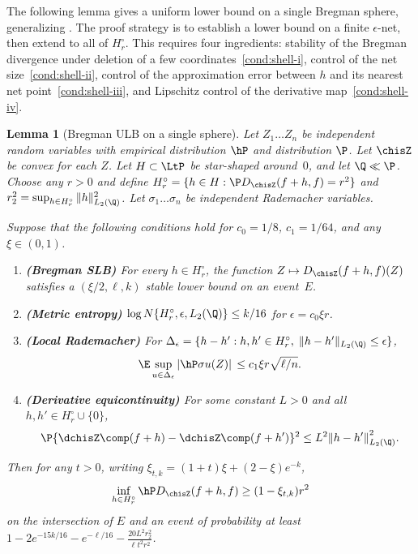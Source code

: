 \documentclass{article}
\newtheorem{lemma}[theorem]{Lemma}
\begin{document}
The following lemma gives a uniform lower bound on a single Bregman sphere, generalizing \citet[Theorem 3.1]{mendelson2021extending}.
The proof strategy is to establish a lower bound
on a finite $\epsilon$-net, then extend to all of $H_r^\circ$.
This requires four ingredients:
stability of the Bregman divergence
under deletion of a few coordinates~\ref{cond:shell-i},
control of the net size~\ref{cond:shell-ii},
control of the approximation error
between $h$ and its nearest net point~\ref{cond:shell-iii},
and Lipschitz control
of the derivative map~\ref{cond:shell-iv}.
\begin{lemma}[Bregman ULB on a single sphere]
\label{lem:bregman-shell}
Let $Z_1 \ldots Z_n$ be independent random variables
with empirical distribution $\hP$ and distribution $\P$.
Let $\chisZ$ be convex for each $Z$.
Let $H \subset \LtP$ be star-shaped around~$0$,
and let $\Q \ll \P$.
Choose any $r > 0$ and define
$H_r^\circ = \{h \in H : \P D_{\chisZ}(f+h, f) = r^2\}$
and $r_2^2 = \sup_{h \in H_r^\circ} \|h\|_{L_2(\Q)}^2$.
Let $\sigma_1 \ldots \sigma_n$ be independent Rademacher variables.

\smallskip

Suppose that the following conditions hold
for $c_0 = 1/8$, $c_1 = 1/64$, and any $\xi \in (0,1)$.
\begin{enumerate}[label=\textup{(\roman*)}]
\item\label{cond:shell-i} \textbf{(Bregman SLB)}
  For every $h \in H_r^\circ$,
  the function $Z \mapsto D_{\chisZ}(f+h, f)(Z)$
  satisfies a $(\xi/2, \ell, k)$ stable lower bound
  on an event~$E$.
\item\label{cond:shell-ii} \textbf{(Metric entropy)}
  $\log N\{H_r^\circ, \epsilon, L_2(\Q)\} \le k/16$
  for $\epsilon = c_0 \xi r$.
\item\label{cond:shell-iii} \textbf{(Local Rademacher)}
  For $\Delta_\epsilon = \{h - h' : h, h' \in H_r^\circ,\;
    \|h - h'\|_{L_2(\Q)} \le \epsilon\}$,
  \[
  \E \sup_{u \in \Delta_\epsilon}
    \abs*{\hP \sigma u(Z)}
    \le c_1 \xi r \sqrt{\ell/n}.
  \]
\item\label{cond:shell-iv} \textbf{(Derivative equicontinuity)}
  For some constant $L > 0$
  and all $h, h' \in H_r^\circ \cup \{0\}$,
  \[
  \P \{ \dchisZ \comp (f+h)
    - \dchisZ \comp (f+h')\}^2
    \le L^2 \norm{h-h'}_{L_2(\Q)}^2.
  \]
\end{enumerate}

\smallskip

Then for any $t > 0$, writing
$\xi_{t,k} = (1+t)\xi + (2 - \xi) e^{-k}$,
\[
  \inf_{h \in H_r^\circ} \hP D_{\chisZ}(f+h, f)
    \ge (1 - \xi_{t,k}) r^2
\]
on the intersection of $E$
and an event of probability at least
$1 - 2e^{-15k/16} - e^{-\ell/16}
  - \frac{20 L^2 r_2^2}{\ell t^2 r^2}$.


\end{lemma}
\end{document}
